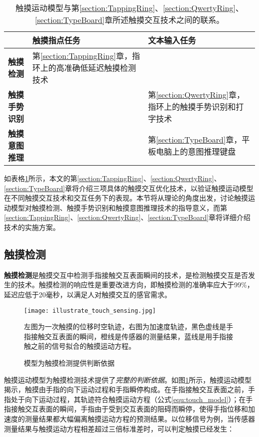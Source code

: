 \begin{table}
	\centering
	\caption{触摸运动模型与第\ref{section:TappingRing}、\ref{section:QwertyRing}、\ref{section:TypeBoard}章所述触摸交互技术之间的联系。}
	\begin{tabular}{|l|p{12em}|p{12em}|}
		\toprule
		 & \textbf{触摸指点任务} & \textbf{文本输入任务} \\
		\midrule
		\textbf{触摸检测} & 第\ref{section:TappingRing}章，指环上的高准确低延迟触摸检测技术 & \\
		\textbf{触摸手势识别} & & 第\ref{section:QwertyRing}章，指环上的触摸手势识别和打字技术 \\
		\textbf{触摸意图推理} & & 第\ref{section:TypeBoard}章，平板电脑上的意图推理键盘 \\
		\bottomrule
	\end{tabular}
	\label{tab:model_paper_relationship}
\end{table}

如表格\ref{tab:model_paper_relationship}所示，本文的第\ref{section:TappingRing}、\ref{section:QwertyRing}、\ref{section:TypeBoard}章将介绍三项具体的触摸交互优化技术，以验证触摸运动模型在不同触摸交互技术和交互任务下的表现。本节将从理论的角度出发，讨论触摸运动模型对触摸检测、触摸手势识别和触摸意图推理技术的指导意义，而第\ref{section:TappingRing}、\ref{section:QwertyRing}、\ref{section:TypeBoard}章将详细介绍技术的实施方案。

\subsection{触摸检测}

\textbf{触摸检测}是触摸交互中检测手指接触交互表面瞬间的技术，是检测触摸交互是否发生的技术。触摸检测的响应性是重要改进方向，即触摸检测的准确率应大于99\%，延迟应低于20毫秒，以满足人对触摸交互的感官需求\cite{jota2013fast}。

\begin{figure}
	\centering
	\texttt{[image: illustrate\_touch\_sensing.jpg]}
	\caption*{左图为一次触摸的位移时空轨迹，右图为加速度轨迹，黑色虚线是手指接触交互表面的瞬间，橙线是传感器的测量结果，蓝线是用手指接触之前的信号拟合的触摸运动方程。}
	\caption{模型为触摸检测提供判断依据}
	\label{fig:illustrate_touch_sensing}
\end{figure}

触摸运动模型为触摸检测技术提供了\emph{完整的判断依据}。如图\ref{fig:illustrate_touch_sensing}所示，触摸运动模型揭示，触摸由手指的向下运动过程和手指瞬停构成。在手指接触交互表面之前，手指处于向下运动过程，其轨迹符合触摸运动方程（公式\ref{equ:touch_model}）；在手指接触交互表面的瞬间，手指由于受到交互表面的阻碍而瞬停，使得手指位移和加速度的测量结果都大幅偏离触摸运动方程的预测结果。以位移信号为例，当传感器测量结果与触摸运动方程相差超过三倍标准差时，可以判定触摸已经发生：

